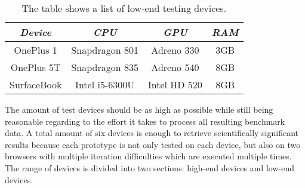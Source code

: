 \begin{table}
  \centering
  \begin{threeparttable}
    \caption{The table shows a list of low-end testing devices.}
    \label{tab:lowendTestingDevices}
    \centering
    \def\rr{\rightskip=0pt plus1em \spaceskip=.3333em \xspaceskip=.5em\relax}
    \setlength{\tabcolsep}{1ex}
    \def\arraystretch{1.20}
    \setlength{\tabcolsep}{1ex}
    \small
    \begin{english}
      \begin{tabular}{|c||c|c|c|}
        \hline
          \multicolumn{1}{|c||}{\emph{Device}}&
          \multicolumn{1}{|c}{\emph{CPU}} &
          \multicolumn{1}{|c}{\emph{GPU}} &
          \multicolumn{1}{|c|}{\emph{RAM}} \\
        \hline
        \hline
        OnePlus 1 & 
        Snapdragon 801 & 
        Adreno 330 & 
        3GB \\
        \hline
        OnePlus 5T & 
        Snapdragon 835 & 
        Adreno 540  & 
        8GB \\
        \hline
        SurfaceBook & 
        Intel i5-6300U & 
        Intel HD 520 & 
        8GB \\
        \hline
      \end{tabular}  
    \end{english}
  \end{threeparttable}
\end{table}

The amount of test devices should be as high as possible while still being reasonable regarding to the effort it takes to process all resulting benchmark data. A total amount of six devices is enough to retrieve scientifically sig\-nifi\-cant results because each prototype is not only tested on each device, but also on two browsers with multiple iteration difficulties which are executed multiple times. The range of devices is divided into two sections: high-end devices and low-end devices. 


